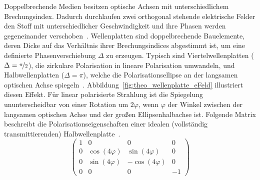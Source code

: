 \documentclass[a4paper,12pt,twoside,parskip=no,headsepline,open=right,ngerman,export]{scrreprt}
\begin{document}
            Doppelbrechende Medien besitzen optische Achsen mit unterschiedlichem Brechungsindex. Dadurch durchlaufen zwei orthogonal stehende elektrische Felder den Stoff mit unterschiedlicher Geschwindigkeit und ihre Phasen werden gegeneinander verschoben~\cite{gil_polarized_2016}. Wellenplatten sind doppelbrechende Bauelemente, deren Dicke auf das Verhältnis ihrer Brechungsindices abgestimmt ist, um eine definierte Phasenverschiebung $\Delta$ zu erzeugen. Typisch sind Viertelwellenplatten ($\Delta=\nicefrac{\pi}{2}$), die zirkulare Polarisation in lineare Polarisation umwandeln, und Halbwellenplatten ($\Delta = \pi$), welche die Polarisationsellipse an der langsamen optischen Achse spiegeln~\cite{gil_polarized_2016}. Abbildung~\ref{fig:theo_wellenplatte_eFeld} illustriert diesen Effekt. Für linear polarisierte Strahlung ist die Spiegelung ununterscheidbar von einer Rotation um $2\varphi$, wenn $\varphi$ der Winkel zwischen der langsamen optischen Achse und der großen Ellipsenhalbachse ist. Folgende Matrix beschreibt die Polarisationseigenschaften einer idealen (vollständig transmittierenden) Halbwellenplatte~\cite{gil_polarized_2016}.
            \begin{equation*}
                \begin{pmatrix}
                    1 & 0 & 0 & 0 \\
                    0 & \cos(4\varphi) &  \sin(4\varphi) & 0 \\
                    0 & \sin(4\varphi) & -\cos(4\varphi) & 0 \\
                    0 & 0 & 0 & -1
                \end{pmatrix}
            \end{equation*}
        
\end{document}
